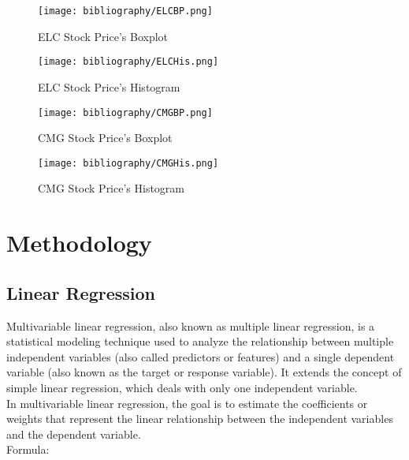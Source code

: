 \documentclass{ieeeojies}
\begin{document}
\begin{figure}[H]
    \centering
    \begin{minipage}{0.23\textwidth}
    \centering
    \texttt{[image: bibliography/ELCBP.png]}
    \caption{ELC Stock Price's Boxplot}
    \label{fig:3}
    \end{minipage}
    \hfill
    \begin{minipage}{0.23\textwidth}
    \centering
    \texttt{[image: bibliography/ELCHis.png]}
    \caption{ELC Stock Price's Histogram}
    \label{fig:4}
    \end{minipage}
\end{figure}

\begin{figure}[H]
    \centering
    \begin{minipage}{0.23\textwidth}
    \centering
    \texttt{[image: bibliography/CMGBP.png]}
    \caption{CMG Stock Price's Boxplot}
    \label{fig:3}
    \end{minipage}
    \hfill
    \begin{minipage}{0.23\textwidth}
    \centering
    \texttt{[image: bibliography/CMGHis.png]}
    \caption{CMG Stock Price's Histogram}
    \label{fig:4}
    \end{minipage}
\end{figure}

\section{Methodology}
\label{sec:Methodology}

\subsection{Linear Regression}
Multivariable linear regression, also known as multiple linear regression, is a statistical modeling technique used to analyze the relationship between multiple independent variables (also called predictors or features) and a single dependent variable (also known as the target or response variable). It extends the concept of simple linear regression, which deals with only one independent variable.\\
In multivariable linear regression, the goal is to estimate the coefficients or weights that represent the linear relationship between the independent variables and the dependent variable. \\
Formula:
\end{document}
